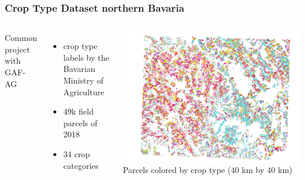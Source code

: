 

\begin{frame}
	\frametitle{Crop Type Dataset northern Bavaria}
	
	\begin{columns}
		Common project with GAF-AG
		\begin{itemize}
			\item crop type labels by the Bavarian Ministry of Agriculture
			\item 49k field parcels of 2018
			\item 34 crop categories
		\end{itemize}
		\includegraphics[width=\textwidth]{images/holl}
		\small
		Parcels colored by crop type (40 km by 40 km)
		
	\end{columns}
	
\end{frame}

